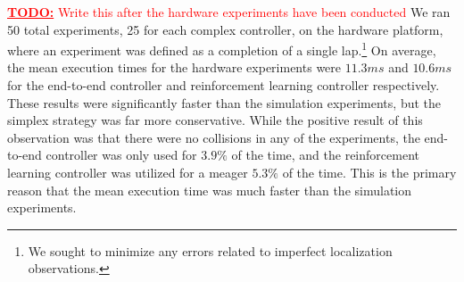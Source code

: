\documentclass[manuscript,screen,review]{acmart}
\newcommand{\todo}[1]{\textcolor{red}{\textbf{\underline{TODO:}} #1}}
\newcommand{\ttj}[1]{\textcolor{red}{\textbf{\underline{TTJ:}} #1}}
\begin{document}
\begin{table}[h]%
\renewcommand{\arraystretch}{1.3}
\caption{Analysis of Wall-Time and Speed Variation:  Simulation Platform}
\label{tab:sim3}
\centering
{}%
\end{table}
\todo{Write this after the hardware experiments have been conducted}
We ran 50 total experiments, 25 for each complex controller, on the hardware platform, where an experiment was defined as a completion of a single lap.\footnote{We sought to minimize any errors related to imperfect localization observations.} On average, the mean execution times for the hardware experiments were $11.3 ms$ and $10.6 ms$ for the end-to-end controller and reinforcement learning controller respectively. These results were significantly faster than the simulation experiments, but the simplex strategy was far more conservative. While the positive result of this observation was that there were no collisions in any of the experiments, the end-to-end controller was only used for $3.9\%$ of the time, and the reinforcement learning controller was utilized for a meager $5.3\%$ of the time. This is the primary reason that the mean execution time was much faster than the simulation experiments. 
\end{document}
